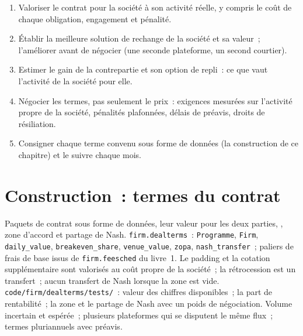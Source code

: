 \begin{method}\label{met:fm:commercial-relationships-with-venues-brokers-and-vendors:negotiate}
\begin{enumerate}
\item Valoriser le contrat pour la société à son activité réelle, y compris le coût de chaque obligation, engagement et pénalité.
\item Établir la meilleure solution de rechange de la société et sa valeur~; l'améliorer avant de négocier (une seconde plateforme, un second courtier).
\item Estimer le gain de la contrepartie et son option de repli~: ce que vaut l'activité de la société pour elle.
\item Négocier les termes, pas seulement le prix~: exigences mesurées sur l'activité propre de la société, pénalités plafonnées, délais de préavis, droits de résiliation.
\item Consigner chaque terme convenu sous forme de données (la construction de ce chapitre) et le suivre chaque mois.
\end{enumerate}
\end{method}

\section{Construction~: termes du contrat}\label{bld:fm:commercial-relationships-with-venues-brokers-and-vendors:dealterms}

\begin{build}
 Paquets de contrat sous forme de données, leur valeur pour les deux parties, , zone d'accord et partage de Nash.
 \texttt{firm.dealterms}~: \texttt{Programme}, \texttt{Firm}, \texttt{daily\_value}, \texttt{breakeven\_share}, \texttt{venue\_value},
\texttt{zopa}, \texttt{nash\_transfer}~; paliers de frais de base issus de \texttt{firm.feesched} du livre~1.
 Le padding et la cotation supplémentaire sont valorisés au coût propre de la société~; la rétrocession est un transfert~; aucun transfert de Nash lorsque la zone est vide.
 \texttt{code/firm/dealterms/tests/}~: valeur des chiffres disponibles~; la part de rentabilité~; la zone et le partage de Nash avec un
poids de négociation.
 Volume incertain et  espérée~; plusieurs plateformes qui se disputent le même flux~; termes pluriannuels avec préavis.
\end{build}

